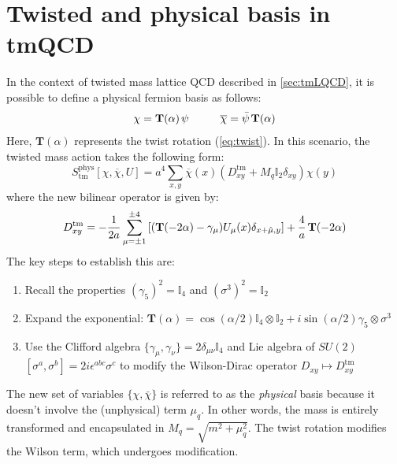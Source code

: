 \documentclass[english, LaM, oneside, noexaminfo]{sapthesis}
\begin{document}
\section{Twisted and physical basis in tmQCD}
\noindent
In the context of twisted mass lattice QCD described in \ref{sec:tmLQCD}, it is possible to define a physical fermion basis as follows:
\begin{equation*}
    \chi = \mathbf{T}(\alpha)\hspace*{0.5mm} \psi \hspace*{1cm} \overline{\chi} = \bar\psi\hspace*{0.5mm}\mathbf{T}(\alpha)
\end{equation*}
Here, $\mathbf{T}(\alpha)$ represents the twist rotation (\ref{eq:twist}).
In this scenario, the twisted mass action takes the following form:
\begin{equation}\label{eq:physical-action}
    S^\text{phys}_\text{tm} [\chi,\overline{\chi},U] = a^4 \sum_{x,y} \overline{\chi} (x) \left( D_{xy}^\text{tm} + M_q \mathbb{I}_2 \delta_{xy}\right) \chi (y)
\end{equation}
where the new bilinear operator is given by:
\begin{equation*}
    D^\text{tm}_{xy} = -\frac{1}{2a} \sum_{\mu = \pm 1}^{\pm 4} \left[ (\mathbf{T}(-2\alpha) - \gamma_\mu) U_\mu (x) \delta_{x+\hat\mu,y} \right] +\frac{4}{a} \hspace*{0.5mm} \mathbf{T}(-2\alpha)
\end{equation*}
The key steps to establish this are:
\begin{enumerate}
    \item Recall the properties $(\gamma_5)^2=\mathbb{I}_4$ and $(\sigma^3)^2=\mathbb{I}_2$
    \item Expand the exponential: $\mathbf{T}(\alpha) = \cos(\alpha/2)\mathbb{I}_4\otimes\mathbb{I}_2 + i\sin(\alpha/2)\gamma_5\otimes\sigma^3$
    \item Use the Clifford algebra $\{\gamma_\mu,\gamma_\nu\}= 2\delta_{\mu\nu}\mathbb{I}_4$ and Lie algebra of $SU(2)$ $[\sigma^a,\sigma^b]=2i\epsilon^{abc}\sigma^c$ to modify the Wilson-Dirac operator $D_{xy} \mapsto D_{xy}^\text{tm}$
\end{enumerate}
The new set of variables $\{\chi,\bar\chi\}$ is referred to as the {\it physical} basis because it doesn't involve the (unphysical) term $\mu_q$.
In other words, the mass is entirely transformed and encapsulated in $M_q = \sqrt{m^2+\mu_q^2}$.
The twist rotation modifies the Wilson term, which undergoes modification. 
\end{document}
